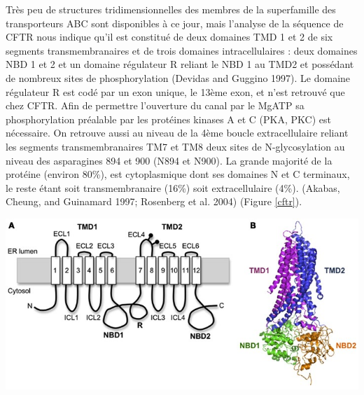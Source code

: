 Très peu de structures tridimensionnelles des membres de la superfamille des transporteurs ABC sont disponibles à ce jour, mais l’analyse de la séquence de CFTR nous indique qu’il est constitué de deux domaines TMD 1 et 2 de six segments transmembranaires et de trois domaines intracellulaires : deux domaines NBD 1 et 2 et un domaine régulateur R reliant le NBD 1 au TMD2 et possédant de nombreux sites de phosphorylation (Devidas and Guggino 1997)\cite{devidas_cftr:_1997}. Le domaine régulateur R est codé par un exon unique, le 13ème exon, et n’est retrouvé que chez CFTR. Afin de permettre l’ouverture du canal par le MgATP sa phosphorylation préalable par les protéines kinases A et C (PKA, PKC) est nécessaire. On retrouve aussi au niveau de la 4ème boucle extracellulaire reliant les segments transmembranaires TM7 et TM8 deux sites de N-glycosylation au niveau des asparagines 894 et 900 (N894 et N900). La grande majorité de la protéine (environ 80\%), est cytoplasmique dont ses domaines N et C terminaux, le reste étant soit transmembranaire (16\%) soit extracellulaire (4\%). (Akabas, Cheung, and Guinamard 1997; Rosenberg et al. 2004)\cite{akabas_probing_1997}\cite{rosenberg_purification_2004} (Figure \ref{cftr}).
\begin{center}
\includegraphics[scale=2]{gfx/CFTR.jpg} 
\captionsetup{type=figure}
       \label{cftr}
\end{center}

